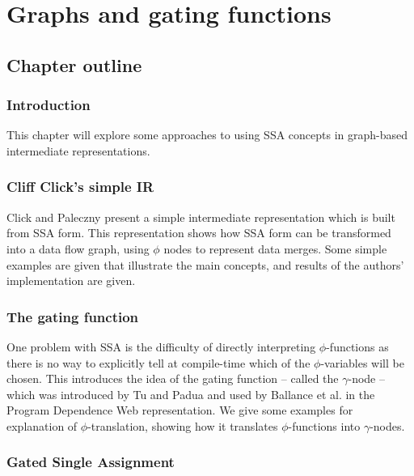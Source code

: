 \chapter{Graphs and gating functions }


\section*{Chapter outline}

\subsection*{Introduction}

This chapter will explore some approaches to using SSA concepts in graph-based intermediate representations. 

\subsection{Cliff Click's simple IR}

Click and Paleczny  \cite{202534} present a simple intermediate representation which is built from SSA form. This representation shows how SSA form can be transformed into a data flow graph, using $\phi$ nodes to represent data merges. Some simple examples are given that illustrate the main concepts, and results of the authors' implementation are given.

\subsection{The gating function}

One problem with SSA is the difficulty of directly interpreting $\phi$-functions as there is no way to explicitly tell at compile-time which of the $\phi$-variables will be chosen. This introduces the idea of the gating function -- called the $\gamma$-node -- which was introduced by Tu and Padua \cite{207115} and used by Ballance et al. in the Program Dependence Web\cite{93578} representation. We give some examples for explanation of $\phi$-translation, showing how it translates $\phi$-functions into $\gamma$-nodes.

\subsection*{Gated Single Assignment}

